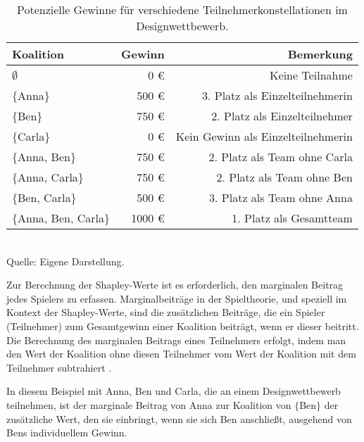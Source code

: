 \begin{table}[!h]
  \caption{Potenzielle Gewinne für verschiedene Teilnehmerkonstellationen im Designwettbewerb.}
  \footnotesize
  \begin{tabularx}{\textwidth}{Xrr}
  \toprule
  Koalition & Gewinn & Bemerkung \\
  \midrule
  $\emptyset$ & 0 \euro & Keine Teilnahme \\
  $\{$Anna$\}$ & 500 \euro & 3. Platz als Einzelteilnehmerin \\
  $\{$Ben$\}$ & 750 \euro & 2. Platz als Einzelteilnehmer \\
  $\{$Carla$\}$ & 0 \euro & Kein Gewinn als Einzelteilnehmerin \\
  $\{$Anna, Ben$\}$ & 750 \euro & 2. Platz als Team ohne Carla \\
  $\{$Anna, Carla$\}$ & 750 \euro & 2. Platz als Team ohne Ben \\
  $\{$Ben, Carla$\}$ & 500 \euro & 3. Platz als Team ohne Anna \\
  $\{$Anna, Ben, Carla$\}$ & 1000 \euro & 1. Platz als Gesamtteam \\
  \bottomrule
  \end{tabularx}
  \label{tab:shapley_example}
  \normalsize\\
  Quelle: Eigene Darstellung.
\end{table}

Zur Berechnung der Shapley-Werte ist es erforderlich, den marginalen Beitrag jedes Spielers zu erfassen.
Marginalbeiträge in der Spieltheorie, und speziell im Kontext der Shapley-Werte, sind die zusätzlichen Beiträge, 
die ein Spieler (Teilnehmer) zum Gesamtgewinn einer Koalition beiträgt, wenn er dieser beitritt. 
Die Berechnung des marginalen Beitrags eines Teilnehmers erfolgt, indem man den Wert der Koalition ohne diesen Teilnehmer 
vom Wert der Koalition mit dem Teilnehmer subtrahiert \cite[S. 18]{Molnar_2023}.

In diesem Beispiel mit Anna, Ben und Carla, die an einem Designwettbewerb teilnehmen, ist der marginale Beitrag von 
Anna zur Koalition von $\{$Ben$\}$ der zusätzliche Wert, den sie einbringt, wenn sie sich Ben anschließt, 
ausgehend von Bens individuellem Gewinn.

